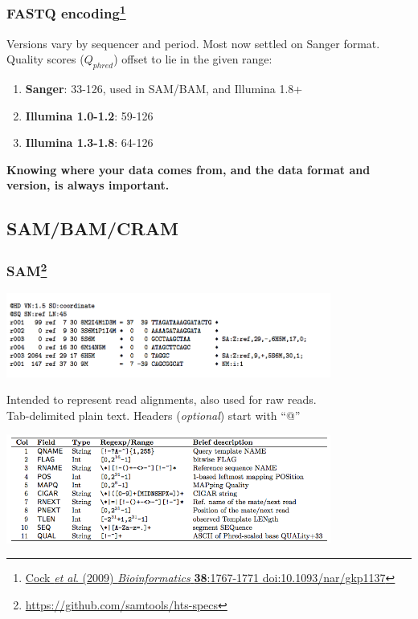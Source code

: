 \begin{frame}[fragile]
  \frametitle{FASTQ encoding\footnote{\tiny{\href{http://dx.doi.org/10.1093/nar/gkp1137}{Cock \textit{et al}. (2009) \textit{Bioinformatics} \textbf{38}:1767-1771 doi:10.1093/nar/gkp1137}}}}
  Versions vary by sequencer and period. Most now settled on Sanger format. \\
  Quality scores ($Q_{phred}$) offset to lie in the given range:
  \begin{enumerate}
    \item \textbf{Sanger}: 33-126, used in SAM/BAM, and Illumina 1.8+
    \item \textbf{Illumina 1.0-1.2}: 59-126
    \item \textbf{Illumina 1.3-1.8}: 64-126
  \end{enumerate}
  \textbf{Knowing where your data comes from, and the data format and version, is always important.}
\end{frame}



\subsection{SAM/BAM/CRAM}

\begin{frame}[fragile]
  \frametitle{SAM\footnote{\tiny{\href{http://samtools.github.io/hts-specs/SAMv1.pdf}{https://github.com/samtools/hts-specs}}}}
  \begin{center}
    \includegraphics[width=0.8\textwidth]{images/sam_format}
  \end{center}  
  Intended to represent read alignments, also used for raw reads. \\
  Tab-delimited plain text. Headers (\textit{optional}) start with ``@'' \\
  \begin{center}
    \includegraphics[width=0.8\textwidth]{images/sam_columns}
  \end{center}  
\end{frame}

